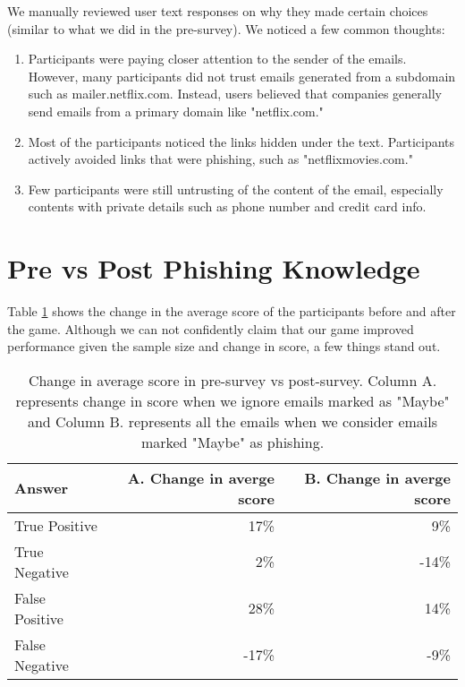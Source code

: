 We manually reviewed user text responses on why they made certain choices (similar to what we did in the pre-survey). We noticed a few common thoughts:

\begin{enumerate}
    \item Participants were paying closer attention to the sender of the emails. However, many participants did not trust emails generated from a subdomain such as mailer.netflix.com. Instead, users believed that companies generally send emails from a primary domain like "netflix.com."
    \item Most of the participants noticed the links hidden under the text. Participants actively avoided links that were phishing, such as "netflixmovies.com."
    \item Few participants were still untrusting of the content of the email, especially contents with private details such as phone number and credit card info.
\end{enumerate}

\section{Pre vs Post Phishing Knowledge}
Table \ref{tab:pre_vs_post} shows the change in the average score of the participants before and after the game. Although we can not confidently claim that our game improved performance given the sample size and change in score, a few things stand out.

\begin{table}[!ht]
    \centering
    \begin{tabular}{l r r}
        \hline
        \textbf{Answer} & \textbf{A. Change in averge score} & \textbf{B. Change in averge score} \\
        \hline
        True Positive   & 17\%                               & 9\%                                \\
        True Negative   & 2\%                                & -14\%                              \\
        False Positive  & 28\%                               & 14\%                               \\
        False Negative  & -17\%                              & -9\%                               \\
        \hline
    \end{tabular}
    \caption{Change in average score in pre-survey vs post-survey. Column A. represents change in score when we ignore emails marked as "Maybe" and Column B. represents all the emails when we consider emails marked "Maybe" as phishing.}
    \label{tab:pre_vs_post}
\end{table}

